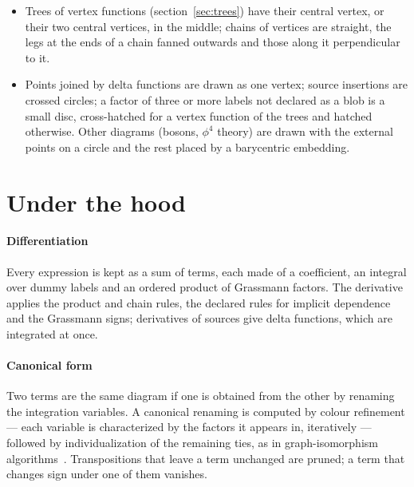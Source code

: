 \documentclass[11pt,a4paper]{article}
\begin{document}
\begin{itemize}
  have their vertices moved alternately apart, so that they cross in pairs. Two bubbles side by side are joined at the sides facing each other, so that the lines
  leave the circles at a wide angle. Where two wavy lines cross, their waves are flattened, so that they read as a
  crossing.
\item Trees of vertex functions (section~\ref{sec:trees}) have their central vertex, or their two central vertices,
  in the middle; chains of vertices are straight, the legs at the ends of a chain fanned outwards and those along it
  perpendicular to it.
\item Points joined by delta functions are drawn as one vertex; source insertions are crossed circles; a factor of three
  or more labels not declared as a blob is a small disc, cross-hatched for a vertex function of the trees and hatched
  otherwise. Other diagrams (bosons, $\phi^4$ theory) are drawn with the external points on a circle and the rest
  placed by a barycentric embedding.
\end{itemize}

\section{Under the hood}\label{sec:hood}

\paragraph{Differentiation} Every expression is kept as a sum of terms, each made of a coefficient, an integral over dummy
labels and an ordered product of Grassmann factors. The derivative applies the product and chain rules, the declared
rules for implicit dependence and the Grassmann signs; derivatives of sources give delta functions, which are integrated
at once.

\paragraph{Canonical form} Two terms are the same diagram if one is obtained from the other by renaming the integration
variables. A canonical renaming is computed by colour refinement --- each variable is characterized by the factors it
appears in, iteratively --- followed by individualization of the remaining ties, as in graph-isomorphism
algorithms~\cite{McKayPiperno2014}.
Transpositions that leave a term unchanged are pruned; a term that changes sign under one of them vanishes.
\end{document}
